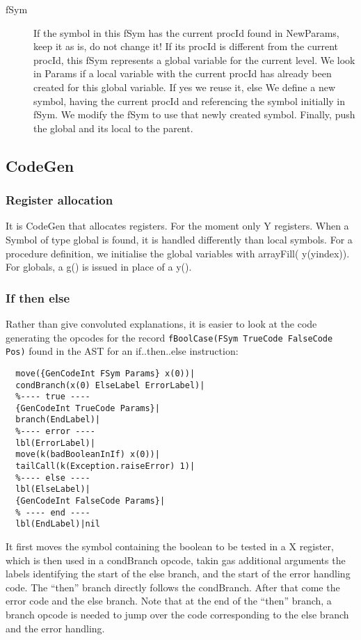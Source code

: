 \documentclass[a4paper]{memoir}
\begin{document}
\begin{description}
   \item[fSym] If the symbol in this fSym has the current procId found in NewParams, keep it as is, do not change it! 
      If its procId is different from the current procId, this fSym represents a global variable for the current level. We look in Params if a local variable with the current procId has already been created for this global variable. If yes we reuse it, else We define a new symbol, having the current procId and referencing the symbol initially in fSym. We modify the fSym to use that newly created symbol. Finally, push the global and its local to the parent.
      
\end{description}



\subsection{CodeGen}
\subsubsection{Register allocation}
It is CodeGen that allocates registers. For the moment only Y registers.
When a Symbol of type global is found, it is handled differently than local symbols.
For a procedure definition, we initialise the global variables with arrayFill( y(yindex)). 
For globals, a g() is issued in place of a y(). 
\subsubsection{If then else}
Rather than give convoluted explanations, it is easier to look at the code generating the opcodes for the record \lstinline!fBoolCase(FSym TrueCode FalseCode Pos)! found in the AST for an if..then..else instruction:
\begin{lstlisting}
  move({GenCodeInt FSym Params} x(0))|
  condBranch(x(0) ElseLabel ErrorLabel)|
  %---- true ----
  {GenCodeInt TrueCode Params}|
  branch(EndLabel)|
  %---- error ----
  lbl(ErrorLabel)|
  move(k(badBooleanInIf) x(0))|
  tailCall(k(Exception.raiseError) 1)|
  %---- else ----
  lbl(ElseLabel)|
  {GenCodeInt FalseCode Params}|
  % ---- end ----
  lbl(EndLabel)|nil
\end{lstlisting}
It first moves the symbol containing the boolean to be tested in a X register, which is then used in a condBranch opcode, takin gas additional arguments the labels identifying the start of the else branch, and the start of the error handling code. The ``then'' branch directly follows the condBranch. After that come the error code and the else branch. Note that at the end of the ``then'' branch, a branch opcode is needed to jump over the code corresponding to the else branch and the error handling.
\end{document}

